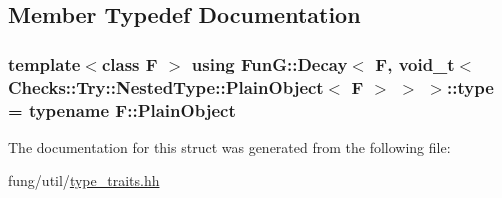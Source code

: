 \subsection{Member Typedef Documentation}
\hypertarget{structFunG_1_1Decay_3_01F_00_01void__t_3_01Checks_1_1Try_1_1NestedType_1_1PlainObject_3_01F_01_4_01_4_01_4_a27b32af38cd1fb109944b71825771648}{
\subsubsection[{type}]{\setlength{\rightskip}{0pt plus 5cm}template$<$class F $>$ using {\bf Fun\-G\-::\-Decay}$<$ F, {\bf void\-\_\-t}$<$ Checks\-::\-Try\-::\-Nested\-Type\-::\-Plain\-Object$<$ F $>$ $>$ $>$\-::{\bf type} =  typename F\-::\-Plain\-Object}}\label{structFunG_1_1Decay_3_01F_00_01void__t_3_01Checks_1_1Try_1_1NestedType_1_1PlainObject_3_01F_01_4_01_4_01_4_a27b32af38cd1fb109944b71825771648}


The documentation for this struct was generated from the following file\-:\begin{DoxyCompactItemize}
\item 
fung/util/\hyperlink{type__traits_8hh}{type\-\_\-traits.\-hh}\end{DoxyCompactItemize}
